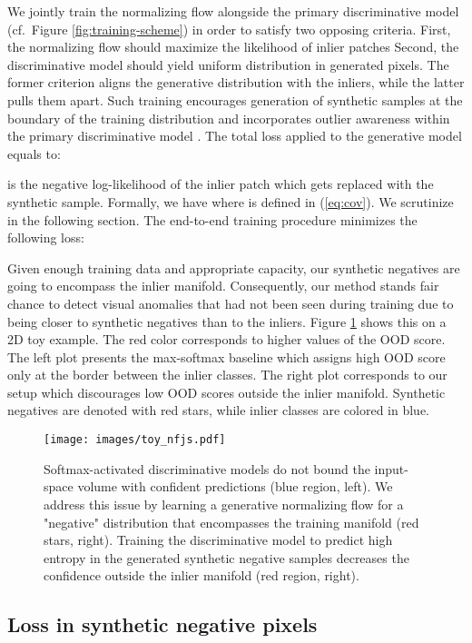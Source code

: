 \documentclass[lettersize,journal,hidelinks]{IEEEtran}
\begin{document}
We jointly train the normalizing flow alongside the primary discriminative model (cf.\ Figure \ref{fig:training-scheme})
in order to satisfy two opposing criteria.
First, the normalizing flow should maximize the likelihood of inlier patches
Second, the discriminative model should yield uniform distribution
in generated pixels. 
The former criterion aligns the generative distribution
with the inliers, while the latter pulls them apart. 
Such training encourages generation of synthetic samples at the boundary of the training distribution and incorporates outlier awareness within the primary discriminative model \cite{lee18iclr}.
The total loss applied to the generative model equals to:

 is the negative log-likelihood of the inlier patch which gets replaced with the synthetic sample.
Formally, we have 
where  is defined in (\ref{eq:cov}).
We scrutinize  in the following section.
The end-to-end training procedure minimizes the following loss: 



Given enough training data and appropriate capacity, our synthetic negatives are going to encompass the inlier manifold.
Consequently, our method stands fair chance to detect visual anomalies that had not been seen during training due to being closer to synthetic negatives than to the inliers.
Figure \ref{fig:toy_nfjs} shows this on a 2D toy example.
The red color corresponds to higher values of the OOD score.
The left plot presents the max-softmax baseline \cite{hendrycks17iclr} which assigns high OOD score only at the border between the inlier classes.
The right plot corresponds to our setup which discourages low OOD scores 
outside the inlier manifold.
Synthetic negatives are denoted with red stars, while inlier classes are colored in blue.
\begin{figure}[ht]
    \centering
    \texttt{[image: images/toy\_nfjs.pdf]}
    \caption{Softmax-activated discriminative models
do not bound the input-space volume
with confident predictions 
(blue region, left).
We address this issue by learning
a generative normalizing flow
for a "negative" distribution 
that encompasses the training manifold
(red stars, right).
Training the discriminative model 
to predict high entropy 
in the generated 
synthetic negative samples
decreases the confidence
outside the inlier manifold 
(red region, right).}
    \label{fig:toy_nfjs}
\end{figure}


\subsection{Loss in synthetic negative pixels}
\label{sec:div-loss}
\end{document}
